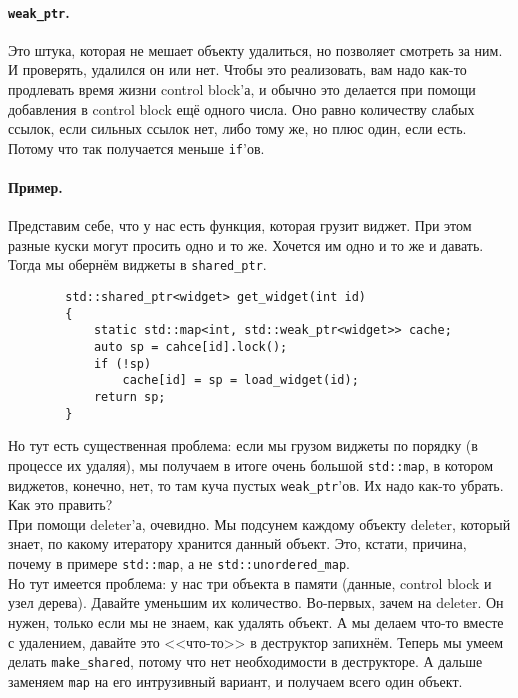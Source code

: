 \documentclass{article}
\begin{document}
    \paragraph{\texttt{weak_ptr}.}
    Это штука, которая не мешает объекту удалиться, но позволяет смотреть за ним. И проверять, удалился он или нет. Чтобы это реализовать, вам надо как-то продлевать время жизни control block'а, и обычно это делается при помощи добавления в control block ещё одного числа. Оно равно количеству слабых ссылок, если сильных ссылок нет, либо тому же, но плюс один, если есть. Потому что так получается меньше \texttt{if}'ов.
    \paragraph{Пример.}
    Представим себе, что у нас есть функция, которая грузит виджет. При этом разные куски могут просить одно и то же. Хочется им одно и то же и давать. Тогда мы обернём виджеты в \texttt{shared_ptr}.
    \begin{verbatim}
        std::shared_ptr<widget> get_widget(int id)
        {
            static std::map<int, std::weak_ptr<widget>> cache;
            auto sp = cahce[id].lock();
            if (!sp)
                cache[id] = sp = load_widget(id);
            return sp;
        }
    \end{verbatim}
    Но тут есть существенная проблема: если мы грузом виджеты по порядку (в процессе их удаляя), мы получаем в итоге очень большой \texttt{std::map}, в котором виджетов, конечно, нет, то там куча пустых \texttt{weak_ptr}'ов. Их надо как-то убрать. Как это править?\\
    При помощи deleter'а, очевидно. Мы подсунем каждому объекту deleter, который знает, по какому итератору хранится данный объект. Это, кстати, причина, почему в примере \texttt{std::map}, а не \texttt{std::unordered_map}.\\
    Но тут имеется проблема: у нас три объекта в памяти (данные, control block и узел дерева). Давайте уменьшим их количество. Во-первых, зачем на deleter. Он нужен, только если мы не знаем, как удалять объект. А мы делаем что-то вместе с удалением, давайте это <<что-то>> в деструктор запихнём. Теперь мы умеем делать \texttt{make_shared}, потому что нет необходимости в деструкторе. А дальше заменяем \texttt{map} на его интрузивный вариант, и получаем всего один объект.
\end{document}
